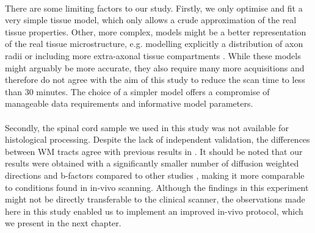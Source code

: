 \paragraph{}
There are some limiting factors to our study. Firstly, we only optimise and fit a very simple tissue model, which only allows a crude approximation of the real tissue properties. Other, more complex, models might be a better representation of the real tissue microstructure, e.g. modelling explicitly a distribution of axon radii \citep{Barazany:2009} or including more extra-axonal tissue compartments \citep{Stanisz:1997,Wang:2011,Panagiotaki:2012}.  While these models might arguably be more accurate, they also require many more acquisitions and therefore do not agree with the aim of this study to reduce the scan time to less than 30 minutes. The choice of a simpler model offers a compromise of manageable data requirements and informative model parameters.
\paragraph{}
Secondly, the spinal cord sample we used in this study was not available for histological processing. Despite the lack of independent validation, the differences between WM tracts agree with previous results in \citep{Golabchi:2010}. It should be noted that our results were obtained with a significantly smaller number of diffusion weighted directions and b-factors compared to other studies \citep{Assaf:2008,Barazany:2009,Panagiotaki:2012}, making it more comparable to conditions found in in-vivo scanning.  Although the findings in this experiment might not be directly transferable to the clinical scanner, the observations made here in this study enabled us to implement an improved in-vivo protocol, which we present in the next chapter.

